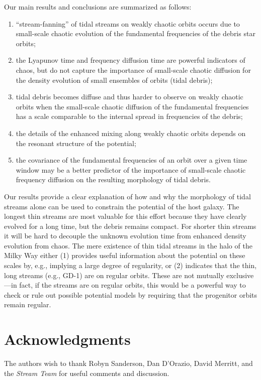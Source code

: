 Our main results and conclusions are summarized as follows:
\begin{enumerate}
	\item ``stream-fanning'' of tidal streams on weakly chaotic orbits \citep[as seen in simulations by][]{pearson15} occurs due to small-scale chaotic evolution of the fundamental frequencies of the debris star orbits;
	\item the Lyapunov time and frequency diffusion time are powerful indicators of chaos, but do not capture the importance of small-scale chaotic diffusion for the density evolution of small ensembles of orbits (tidal debris);
	\item tidal debris becomes diffuse and thus harder to observe on weakly chaotic orbits when the small-scale chaotic diffusion of the fundamental frequencies has a scale comparable to the internal spread in frequencies of the debris;
	\item the details of the enhanced mixing along weakly chaotic orbits depends on the resonant structure of the potential;
	\item the covariance of the fundamental frequencies of an orbit over a given time window may be a better predictor of the importance of small-scale chaotic frequency diffusion on the resulting morphology of tidal debris.
\end{enumerate}

Our results provide a clear explanation of how and why the morphology of tidal streams alone can be used to constrain the potential of the host galaxy. The longest thin streams are most valuable for this effort because they have clearly evolved for a long time, but the debris remains compact. For shorter thin streams it will be hard to decouple the unknown evolution time from enhanced density evolution from chaos. The mere existence of thin tidal streams in the halo of the Milky Way either (1) provides useful information about the potential on these scales by, e.g., implying a large degree of regularity, or (2) indicates that the thin, long streams (e.g., GD-1) are on regular orbits. These are not mutually exclusive---in fact, if the streams are on regular orbits, this would be a powerful way to check or rule out possible potential models by requiring that the progenitor orbits remain regular. 

\section*{Acknowledgments}
The authors wish to thank Robyn Sanderson, Dan D'Orazio, David Merritt, and the \emph{Stream Team} for useful comments and discussion. 

